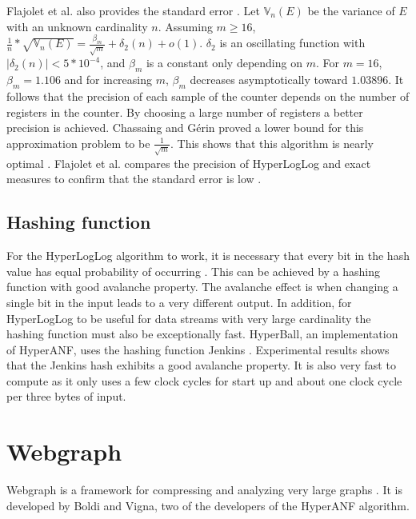 Flajolet et al. also provides the standard error \cite{hyperloglog}. Let $\mathbb{V}_n(E)$ be the variance of $E$ with an unknown cardinality $n$. Assuming $m \geq 16$,  $\frac{1}{n}*\sqrt{\mathbb{V}_n(E)} = \frac{\beta_m}{\sqrt{m}}  + \delta_2(n) + o(1)$. $\delta_2$ is an oscillating function with $|\delta_2(n)| < 5*10^{-4}$, and $\beta_m$ is a constant only depending on $m$. For $m = 16$, $\beta_m = 1.106$ and for increasing $m$, $\beta_m$ decreases asymptotically toward $1.03896$. It follows that the precision of each sample of the counter depends on the number of registers in the counter. By choosing a large number of registers a better precision is achieved. Chassaing and Gérin proved a lower bound for this approximation problem to be $\frac{1}{\sqrt{m}}$. This shows that this algorithm is nearly optimal \cite{nearopt}. Flajolet et al. compares the precision of HyperLogLog and exact measures to confirm that the standard error is low \cite{hyperloglog}.

\subsection{Hashing function}
For the HyperLogLog algorithm to work, it is necessary that every bit in the hash value has equal probability of occurring \cite{hyperloglog}. This can be achieved by a hashing function with good avalanche property. The avalanche effect is when changing a single bit in the input leads to a very different output. In addition, for HyperLogLog to be useful for data streams with very large cardinality the hashing function must also be exceptionally fast. HyperBall, an implementation of HyperANF, uses the hashing function Jenkins \cite{webgraph}. Experimental results shows that the Jenkins hash exhibits a good avalanche property. It is also very fast to compute as it only uses a few clock cycles for start up and about one clock cycle per three bytes of input.

\iffalse
\subsection{BroadWord}
Broadword is a way to do several calculations at the same time using cleverly constructed binary-logic expressions. HyperANF uses broadword to take the union $U$ of two HyperLogLog counters $A$ and $B$, which effectively is taking $\forall i; U_i = max(A_i,B_i)$
\fi

\section{Webgraph}
Webgraph is a framework for compressing and analyzing very large graphs \cite{webgraph}. It is developed by Boldi and Vigna, two of the developers of the HyperANF algorithm.


